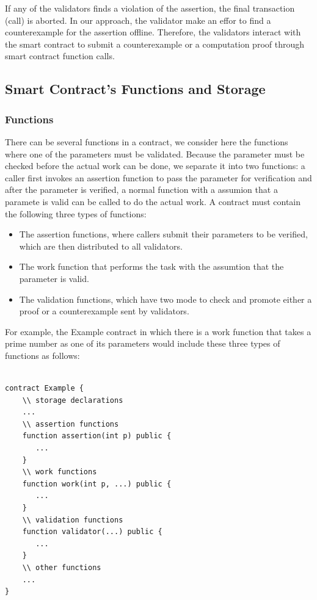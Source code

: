\documentclass[runningheads]{llncs}
\begin{document}
If any of the validators finds a violation of the assertion, the final transaction (call) is aborted. In our approach, the validator make an effor to find a counterexample for the assertion offline. Therefore, the validators interact with the smart contract to submit a  counterexample or a computation proof through smart contract function calls. 
\subsection{Smart Contract's Functions and Storage}
\subsubsection{Functions}
There can be several functions in a contract, we consider here the functions where one of the parameters must be validated. Because the parameter must be checked before the actual work can be done, we separate it into two functions: a caller first invokes an assertion function to pass the parameter for  verification and after the parameter is verified, a normal function with a assumion that a paramete is valid can be called to do the actual work.  A contract must contain the following three types of functions:  

\begin{itemize}
\item The assertion functions, where callers submit their parameters to be verified, which are then distributed to all validators. 
\item  The work function that performs the task with the assumtion that the parameter is valid. 
\item The validation functions, which have two mode to check and promote either a proof or a counterexample sent by validators.
\end{itemize}

For example, the Example contract in which there is a work function that  takes a prime number as one of its parameters would include these three types of functions  as follows:

\begin{lstlisting}[numbers=none]

contract Example {
    \\ storage declarations
    ...
    \\ assertion functions
    function assertion(int p) public {
       ...
    } 
    \\ work functions
    function work(int p, ...) public {
       ...
    }
    \\ validation functions   
    function validator(...) public {
       ...
    }
    \\ other functions
    ...
}
\end{lstlisting}
\end{document}
